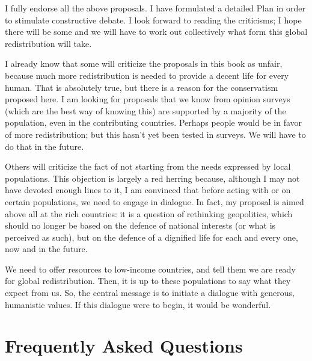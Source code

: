 \documentclass[a5paper,english,openany]{memoir}
\begin{document}
I fully endorse all %
the above proposals. I have formulated a detailed Plan in order to stimulate constructive debate. I look forward to reading the criticisms; I hope there will be some %
and we will have to work out collectively what form this global redistribution will take. 

I already know that some will criticize %
the proposals in this book as unfair, %
because much more redistribution is needed to provide a decent life %
for every human. That is %
absolutely true, but there is %
a reason for the conservatism proposed here. 
I am looking for proposals that we know from opinion surveys (which are the best way of knowing this) are supported by a majority of the population, even in the contributing countries. Perhaps people would be in favor %
of more redistribution; but this hasn't yet been tested in surveys. We will have to do that in the future.  %

Others will criticize %
the fact of not starting from the needs expressed by local populations. 
This objection is largely a red herring because, although I may not have devoted enough lines to it, I am convinced that before acting with or on certain populations, we need to engage in dialogue. In fact, my proposal is aimed above all at the rich countries: it is a question of rethinking geopolitics, which should no longer be based on the defence %
of national interests (or what is perceived as such), but on the defence %
of a dignified life for each and every one, now and in the future. 

We need to offer resources to low-income countries, and tell them %
we are ready for global redistribution. Then, it is up to these populations to say what they expect from us. 
So, the central message is to initiate a dialogue with generous, humanistic values. If this dialogue were to begin, it would be wonderful. 

\chapter*{Frequently Asked Questions}\label{ch:faq}
\end{document}
